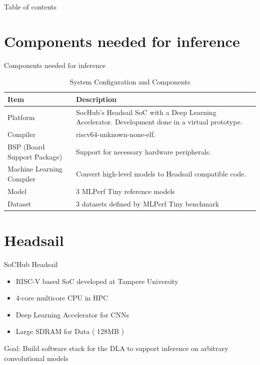 %
%

\begin{frame}
\titlepage
\end{frame}

\begin{frame}{Table of contents}
\tableofcontents
\end{frame}

\section{Components needed for inference}
\begin{frame}{Components needed for inference}
\begin{table}[ht]
\centering
\begin{tabular}{|l|p{8cm}|}
\hline
\textbf{Item} & \textbf{Description} \\ \hline
Platform & SocHub's Headsail SoC with a Deep Learning Accelerator. Development done in a virtual prototype. \\ \hline
Compiler & riscv64-unknown-none-elf. \\ \hline
BSP (Board Support Package) & Support for necessary hardware peripherals. \\ \hline
Machine Learning Compiler & Convert high-level models to Headsail compatible code. \\ \hline
Model & 3 MLPerf Tiny reference models \\ \hline
Dataset &  3 datasets defined by MLPerf Tiny benchmark  \\ \hline
\end{tabular}
\caption{System Configuration and Components}
\label{tab:system_components}
\end{table}
\end{frame}

\section{Headsail}
\begin{frame}{SoCHub Headsail}
  \begin{itemize}
          \item RISC-V based SoC developed at Tampere University
          \item 4-core multicore CPU in HPC
          \item Deep Learning Accelerator for CNNs
          \item Large SDRAM for Data ( 128MB )
  \end{itemize}
  Goal: Build software stack for the DLA to support inference on arbitrary convolutional models

\end{frame}

